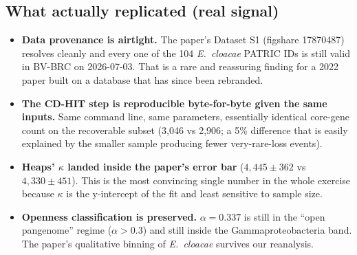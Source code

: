 \documentclass[11pt,a4paper]{article}
\begin{document}
\subsection{What actually replicated (real signal)}
\begin{itemize}
  \item \textbf{Data provenance is airtight.} The paper's Dataset S1 (figshare 17870487) resolves cleanly and every one of the 104 \textit{E.\ cloacae} PATRIC IDs is still valid in BV-BRC on 2026-07-03. That is a rare and reassuring finding for a 2022 paper built on a database that has since been rebranded.
  \item \textbf{The CD-HIT step is reproducible byte-for-byte given the same inputs.} Same command line, same parameters, essentially identical core-gene count on the recoverable subset (3{,}046 vs 2{,}906; a 5\% difference that is easily explained by the smaller sample producing fewer very-rare-loss events).
  \item \textbf{Heaps' $\kappa$ landed inside the paper's error bar} ($4{,}445 \pm 362$ vs $4{,}330 \pm 451$). This is the most convincing single number in the whole exercise because $\kappa$ is the y-intercept of the fit and least sensitive to sample size.
  \item \textbf{Openness classification is preserved.} $\alpha = 0.337$ is still in the ``open pangenome'' regime ($\alpha > 0.3$) and still inside the Gammaproteobacteria band. The paper's qualitative binning of \textit{E.\ cloacae} survives our reanalysis.
\end{itemize}
\end{document}
